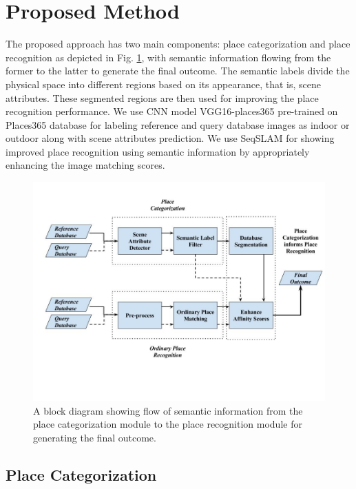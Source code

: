 \documentclass[letterpaper, 10 pt, conference]{ieeeconf}  %
\begin{document}
\section{Proposed Method}
The proposed approach has two main components: place categorization and place recognition as depicted in Fig. \ref{fig:flowchart}, with semantic information flowing from the former to the latter to generate the final outcome. The semantic labels divide the physical space into different regions based on its appearance, that is, scene attributes. These segmented regions are then used for improving the place recognition performance. We use CNN model VGG16-places365 \cite{cnnPlaces365Github} pre-trained on Places365 database \cite{zhou2014learning} for labeling reference and query database images as indoor or outdoor along with scene attributes \cite{Patterson2012SunAttributes} prediction. We use SeqSLAM \cite{Milford2012} for showing improved place recognition using semantic information by appropriately enhancing the image matching scores.

\begin{figure}
 \includegraphics[clip, trim=1cm 5cm 0cm 2cm,scale=0.3]{flowchart}
 \caption{A block diagram showing flow of semantic information from the place categorization module to the place recognition module for generating the final outcome.}
 \label{fig:flowchart}
\end{figure}


\subsection{Place Categorization}
\end{document}
